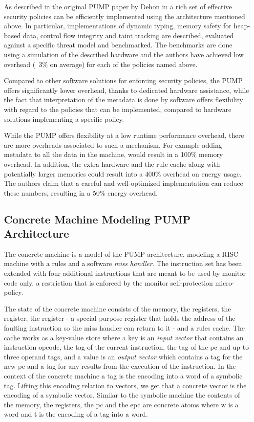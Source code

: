 As described in the original PUMP paper by Dehon \ETAL in
\cite{pump_hasp2014} a rich set of effective security policies can be
efficiently implemented using the architecture mentioned above. In
particular, implementations of dynamic typing, memory safety for
heap-based data, control flow integrity and taint tracking are
described, evaluated against a specific threat model and
benchmarked. The benchmarks are done using a simulation of the
described hardware and the authors have achieved low overhead (~3\% on
average) for each of the policies named above.

Compared to other software solutions for enforcing security policies,
the PUMP offers significantly lower overhead, thanks to dedicated
hardware assistance, while the fact that interpretation of the
metadata is done by software offers flexibility with regard to the
policies that can be implemented, compared to hardware solutions
implementing a specific policy.

While the PUMP offers flexibility at a low runtime performance
overhead, there are more overheads associated to such a mechanism. For
example adding metadata to all the data in the machine, would result
in a 100\% memory overhead.  In addition, the extra hardware and the
rule cache along with potentially larger memories could result into a
400\% overhead on energy usage. The authors claim that a careful and
well-optimized implementation can reduce these numbers, resulting in a
50\% energy overhead.

\subsection{Concrete Machine Modeling PUMP Architecture}\label{sec:concrete}

The concrete machine is a model of the PUMP architecture, modeling a
RISC machine with a rules \cache and a software \emph{miss handler}.
The instruction set has been extended with four additional
instructions that are meant to be used by monitor code only, a
restriction that is enforced by the monitor self-protection
micro-policy.

The state of the concrete machine consists of the memory, the
registers, the \pc register, the \epc register - a special purpose
register that holds the address of the faulting instruction so the
miss handler can return to it - and a rules cache. The cache works as
a key-value store where a key is an \emph{input vector} that contains
an instruction opcode, the tag of the current instruction, the tag of
the pc and up to three operand tags, and a value is an \emph{output
  vector} which contains a tag for the new pc and a tag for any
results from the execution of the instruction. In the context of the
concrete machine a tag is the encoding into a word of a symbolic
tag. Lifting this encoding relation to vectors, we get that a concrete
vector is the encoding of a symbolic vector. Similar to the symbolic
machine the contents of the memory, the registers, the pc and the epc
are concrete atoms  where w is a word and t is the encoding
of a tag into a word.

